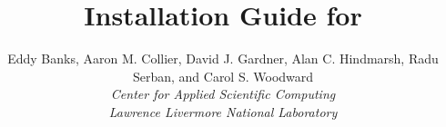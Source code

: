 \documentclass[twoside,openright,10pt]{report}
\title{Installation Guide for {\sundials} {\sunrelease}}
\author{
  Eddy Banks, Aaron M. Collier, David J. Gardner, Alan C. Hindmarsh, Radu Serban, and Carol S. Woodward\\
  {\em Center for Applied Scientific Computing} \\
  {\em Lawrence Livermore National Laboratory}
}
\date{
  \today 
  \vfill {\centerline{\texttt{[image: doc\_logo\_blue]}}}
  \vfill \kinucrlug
}
\begin{document}
\frontex


\clearemptydoublepage
\end{document}
